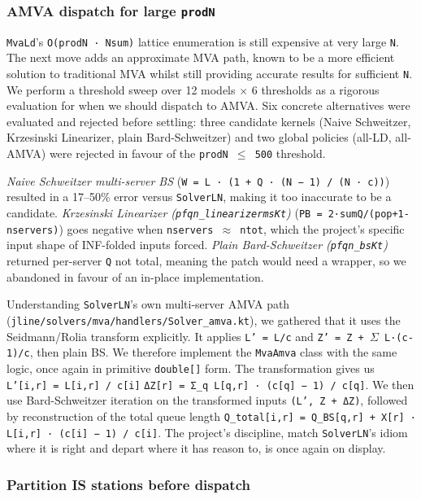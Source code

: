 \subsubsection*{AMVA dispatch for large \texttt{prodN}}

\texttt{MvaLd}'s \texttt{O(prodN · Nsum)} lattice enumeration is still expensive at very large \texttt{N}. The next move adds an approximate MVA path, known to be a more efficient solution to traditional MVA whilst still providing accurate results for sufficient \texttt{N}. We perform a threshold sweep over 12 models $\times$ 6 thresholds as a rigorous evaluation for when we should dispatch to AMVA. Six concrete alternatives were evaluated and rejected before settling: three candidate kernels (Naive Schweitzer, Krzesinski Linearizer, plain Bard-Schweitzer) and two global policies (all-LD, all-AMVA) were rejected in favour of the \texttt{prodN $\leq$ 500} threshold.

\textit{Naive Schweitzer multi-server BS} (\texttt{W = L · (1 + Q · (N − 1) / (N · c))}) resulted in a 17--50\% error versus \texttt{SolverLN}, making it too inaccurate to be a candidate. \textit{Krzesinski Linearizer (\texttt{pfqn\_linearizermsKt})} (\texttt{PB = 2·sumQ/(pop+1-nservers)}) goes negative when \texttt{nservers $\approx$ ntot}, which the project's specific input shape of INF-folded inputs forced. \textit{Plain Bard-Schweitzer (\texttt{pfqn\_bsKt})} returned per-server \texttt{Q} not total, meaning the patch would need a wrapper, so we abandoned in favour of an in-place implementation.

Understanding \texttt{SolverLN}'s own multi-server AMVA path (\texttt{jline/solvers/mva/handlers/Solver\_amva.kt}), we gathered that it uses the Seidmann/Rolia transform explicitly. It applies \texttt{L' = L/c} and \texttt{Z' = Z + $\Sigma$ L·(c-1)/c}, then plain BS. We therefore implement the \texttt{MvaAmva} class with the same logic, once again in primitive \texttt{double[]} form. The transformation gives us \texttt{L'[i,r] = L[i,r] / c[i]} \texttt{ΔZ[r] = Σ\_q L[q,r] · (c[q] − 1) / c[q]}. We then use Bard-Schweitzer iteration on the transformed inputs \texttt{(L', Z + ΔZ)}, followed by reconstruction of the total queue length \texttt{Q\_total[i,r] = Q\_BS[q,r] + X[r] · L[i,r] · (c[i] − 1) / c[i]}. The project's discipline, match \texttt{SolverLN}'s idiom where it is right and depart where it has reason to, is once again on display.



\subsubsection*{Partition IS stations before dispatch}

